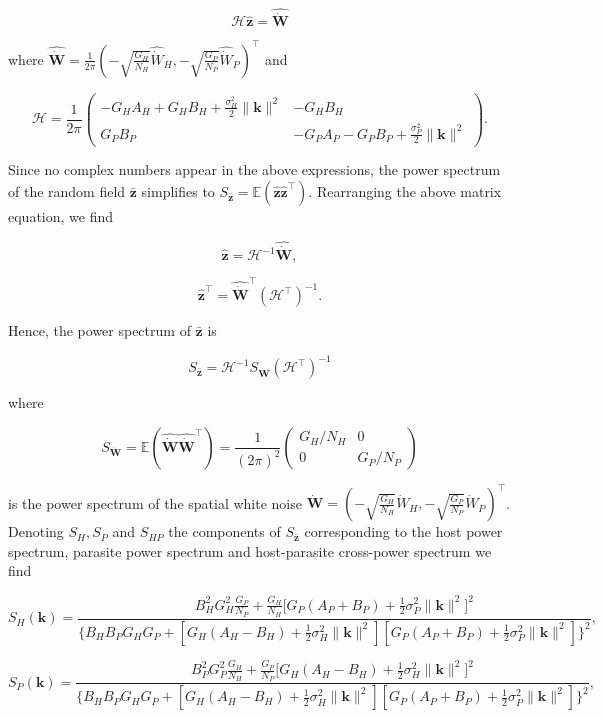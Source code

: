 \documentclass{article}
\begin{document}
\[\mathscr H\hat{\pmb z}=\widehat{\dot{\pmb W}}\]

where
\(\widehat{\dot{\pmb W}}=\tfrac{1}{2\pi}\left(-\sqrt{\tfrac{G_H}{N_H}}\hat{\dot W}_H, -\sqrt{\tfrac{G_P}{N_P}}\hat{\dot W}_P\right)^\top\)
and

\[\mathscr H=\frac{1}{2\pi}\left(\begin{matrix}-G_HA_H+G_HB_H+\frac{\sigma_H^2}{2}\|\pmb k\|^2 & -G_HB_H \\ G_PB_P & -G_PA_P-G_PB_P+\frac{\sigma_P^2}{2}\|\pmb k\|^2\end{matrix}\right).\]

Since no complex numbers appear in the above expressions, the power
spectrum of the random field \(\bar{\pmb z}\) simplifies to
\(S_{\bar{\pmb z}}=\mathbb E\left(\hat{\pmb z}\hat{\pmb z}^\top\right)\).
Rearranging the above matrix equation, we find

\[\hat{\pmb z}=\mathscr H^{-1}\widehat{\dot{\pmb W}},\]

\[\hat{\pmb z}^\top=\widehat{\dot{\pmb W}}^\top\left(\mathscr H^\top\right)^{-1}.\]

Hence, the power spectrum of \(\bar{\pmb z}\) is

\[S_{\bar{\pmb z}}=\mathscr H^{-1}S_{\dot{\pmb W}}\left(\mathscr H^\top\right)^{-1}\]

where

\[S_{\dot{\pmb W}}=\mathbb E\left(\widehat{\dot{\pmb W}}\widehat{\dot{\pmb W}}^\top\right)=\frac{1}{(2\pi)^2}\left(\begin{matrix}G_H/N_H & 0 \\ 0 & G_P/N_P \end{matrix}\right)\]

is the power spectrum of the spatial white noise
\(\dot{\pmb W}=\left(-\sqrt{\tfrac{G_H}{N_H}}{\dot W}_H, -\sqrt{\tfrac{G_P}{N_P}}{\dot W}_P\right)^\top\).
Denoting \(S_H,S_P\) and \(S_{HP}\) the components of
\(S_{\bar{\pmb z}}\) corresponding to the host power spectrum, parasite
power spectrum and host-parasite cross-power spectrum we find

\[S_H(\pmb k)=\frac{B_H^2G_H^2\frac{G_P}{N_P}+\frac{G_H}{N_H}\big[G_P(A_P+B_P)+\frac{1}{2}\sigma_P^2\|\pmb k\|^2\big]^2}{\big\{B_HB_PG_HG_P+[G_H(A_H-B_H)+\frac{1}{2}\sigma_H^2\|\pmb k\|^2][G_P(A_P+B_P)+\frac{1}{2}\sigma_P^2\|\pmb k\|^2]\big\}^2},\]

\[S_P(\pmb k)=\frac{B_P^2G_P^2\frac{G_H}{N_H}+\frac{G_P}{N_P}\big[G_H(A_H-B_H)+\frac{1}{2}\sigma_H^2\|\pmb k\|^2\big]^2}{\big\{B_HB_PG_HG_P+[G_H(A_H-B_H)+\frac{1}{2}\sigma_H^2\|\pmb k\|^2][G_P(A_P+B_P)+\frac{1}{2}\sigma_P^2\|\pmb k\|^2]\big\}^2},\]
\end{document}
